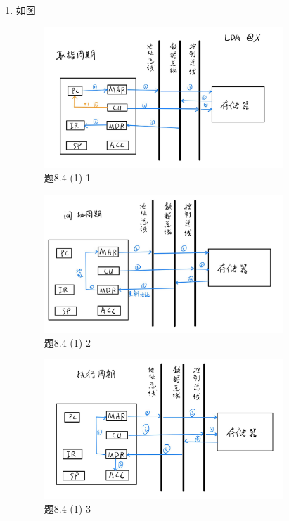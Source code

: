 \documentclass[UTF8]{report}
\newenvironment{solution}{{\noindent\hskip 2em \bf 解 \quad}}{}
\begin{document}
\begin{solution}
    \begin{enumerate}[label=(\arabic*)]
        \item 如图

        \begin{figure}[!htbp]
            \centering
            \includegraphics[width=9cm]{fig/8.4_1.png}
            \caption{题8.4 (1) 1}
            \label{fig:8_4_1}
        \end{figure}
        \newpage
        \begin{figure}[!htbp]
            \centering
            \includegraphics[width=9cm]{fig/8.4_2.png}
            \caption{题8.4 (1) 2}
            \label{fig:8_4_2}
        \end{figure}
        \begin{figure}[!htbp]
            \centering
            \includegraphics[width=9cm]{fig/8.4_3.png}
            \caption{题8.4 (1) 3}
            \label{fig:8_4_3}
        \end{figure}


\end{enumerate}
\end{solution}
\end{document}

